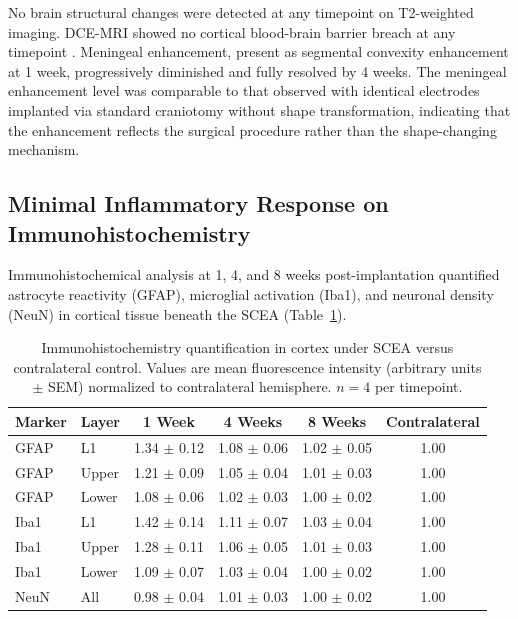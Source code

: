 \documentclass[11pt]{article}
\begin{document}
No brain structural changes were detected at any timepoint on T2-weighted imaging. DCE-MRI showed no cortical blood-brain barrier breach at any timepoint \citep{dce_mri_bbb2014}. Meningeal enhancement, present as segmental convexity enhancement at 1 week, progressively diminished and fully resolved by 4 weeks. The meningeal enhancement level was comparable to that observed with identical electrodes implanted via standard craniotomy without shape transformation, indicating that the enhancement reflects the surgical procedure rather than the shape-changing mechanism.

\subsection{Minimal Inflammatory Response on Immunohistochemistry}

Immunohistochemical analysis at 1, 4, and 8 weeks post-implantation quantified astrocyte reactivity (GFAP), microglial activation (Iba1), and neuronal density (NeuN) in cortical tissue beneath the SCEA (Table~\ref{tab:ihc}).

\begin{table}[H]
\centering
\caption{Immunohistochemistry quantification in cortex under SCEA versus contralateral control. Values are mean fluorescence intensity (arbitrary units $\pm$ SEM) normalized to contralateral hemisphere. $n = 4$ per timepoint.}
\label{tab:ihc}
\begin{tabular}{llcccc}
\toprule
Marker & Layer & 1 Week & 4 Weeks & 8 Weeks & Contralateral \\
\midrule
GFAP & L1 & 1.34 $\pm$ 0.12 & 1.08 $\pm$ 0.06 & 1.02 $\pm$ 0.05 & 1.00 \\
GFAP & Upper & 1.21 $\pm$ 0.09 & 1.05 $\pm$ 0.04 & 1.01 $\pm$ 0.03 & 1.00 \\
GFAP & Lower & 1.08 $\pm$ 0.06 & 1.02 $\pm$ 0.03 & 1.00 $\pm$ 0.02 & 1.00 \\
Iba1 & L1 & 1.42 $\pm$ 0.14 & 1.11 $\pm$ 0.07 & 1.03 $\pm$ 0.04 & 1.00 \\
Iba1 & Upper & 1.28 $\pm$ 0.11 & 1.06 $\pm$ 0.05 & 1.01 $\pm$ 0.03 & 1.00 \\
Iba1 & Lower & 1.09 $\pm$ 0.07 & 1.03 $\pm$ 0.04 & 1.00 $\pm$ 0.02 & 1.00 \\
NeuN & All & 0.98 $\pm$ 0.04 & 1.01 $\pm$ 0.03 & 1.00 $\pm$ 0.02 & 1.00 \\
\bottomrule
\end{tabular}
\end{table}
\end{document}
